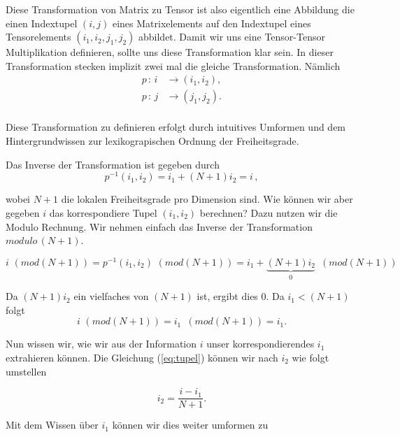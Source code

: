 Diese Transformation von Matrix zu Tensor ist also eigentlich eine Abbildung die einen Indextupel $(i,j)$ eines Matrixelements auf den Indextupel eines Tensorelements $(i_1,i_2,j_1,j_2)$ abbildet. Damit wir uns eine Tensor-Tensor Multiplikation definieren, sollte uns diese Transformation klar sein.
In dieser Transformation stecken implizit zwei mal die gleiche Transformation. Nämlich
\begin{equation*}
\begin{aligned}
p \, : \, i &\rightarrow (i_1,i_2) ,\\
p \, : \, j &\rightarrow (j_1,j_2) .\\
\end{aligned}
\end{equation*}

Diese Transformation zu definieren erfolgt durch intuitives Umformen und dem Hintergrundwissen zur lexikograpischen Ordnung der Freiheitsgrade.

Das Inverse der Transformation ist gegeben durch
\begin{equation} \label{eq:tupel}
p^{-1}(i_1,i_2) = i_1 + (N+1)i_2 = i \, ,
\end{equation}

wobei $N+1$ die lokalen Freiheitsgrade pro Dimension sind.
Wie können wir aber gegeben $i$ das korrespondiere Tupel $(i_1,i_2)$ berechnen?
Dazu nutzen wir die Modulo Rechnung. Wir nehmen einfach das Inverse der Transformation $modulo \, (N+1)$. 

\begin{equation}
i \, \, (mod (N+1))=p^{-1}(i_1,i_2) \, \, (mod (N+1)) = i_1 + \underbrace{(N+1)i_2}_{0} \, \, \, (mod (N+1)) 
\end{equation}

Da $(N+1)i_2$ ein vielfaches von $(N+1)$ ist, ergibt dies 0. Da $i_1 < (N+1)$ folgt 
\begin{equation}
i \, \, (mod (N+1)) = i_1 \, \, \, (mod (N+1)) = i_1.
\end{equation}

Nun wissen wir, wie wir aus der Information $i$ unser korrespondierendes $i_1$ extrahieren können. Die Gleichung (\ref{eq:tupel}) können wir nach $i_2$ wie folgt umstellen

\begin{equation} \label{eq:tupel2}
 i_2 = \dfrac{ i - i_1 } {N+1}.
\end{equation}

Mit dem Wissen über $i_1$ können wir dies weiter umformen zu

